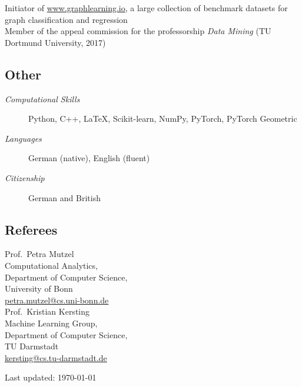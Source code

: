 \documentclass[11pt, a4paper]{scrartcl}
\begin{document}
Initiator of \url{www.graphlearning.io}, a large collection of benchmark datasets for graph classification and regression\\

Member of the appeal commission for the professorship \emph{Data Mining} (TU Dortmund University, 2017)

\subsection*{Other}
\begin{description}
	\item[\em Computational Skills] Python, C\hspace{-2pt}+\hspace{-3pt}+, \LaTeX, Scikit-learn, NumPy, PyTorch, PyTorch Geometric
	\item[\em Languages] German (native), English (fluent)
	\item[\em Citizenship] German and British
\end{description}

\subsection*{Referees}
Prof.~Petra Mutzel\\
Computational Analytics,\\ 
Department of Computer Science,\\
University of Bonn \\
\href{mailto:petra.mutzel@cs.uni-bonn.de}{petra.mutzel@cs.uni-bonn.de}\\


Prof.~Kristian Kersting\\ 
Machine Learning Group,\\
Department of Computer Science,\\
TU Darmstadt\\
\href{mailto:kersting@cs.tu-darmstadt.de}{kersting@cs.tu-darmstadt.de}\\

\vfill{} 
\begin{center}
{\scriptsize Last updated: \today}
\end{center}
\end{document}
